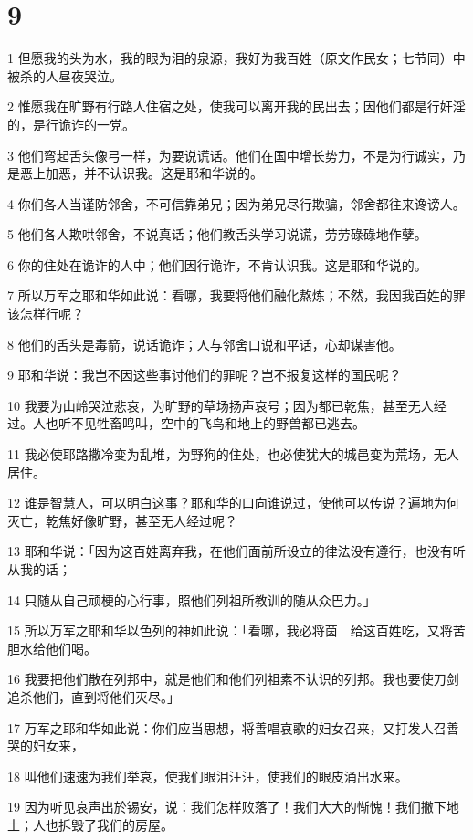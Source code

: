 \chapter{9}

\par 1 但愿我的头为水，我的眼为泪的泉源，我好为我百姓（原文作民女；七节同）中被杀的人昼夜哭泣。
\par 2 惟愿我在旷野有行路人住宿之处，使我可以离开我的民出去；因他们都是行奸淫的，是行诡诈的一党。
\par 3 他们弯起舌头像弓一样，为要说谎话。他们在国中增长势力，不是为行诚实，乃是恶上加恶，并不认识我。这是耶和华说的。
\par 4 你们各人当谨防邻舍，不可信靠弟兄；因为弟兄尽行欺骗，邻舍都往来谗谤人。
\par 5 他们各人欺哄邻舍，不说真话；他们教舌头学习说谎，劳劳碌碌地作孽。
\par 6 你的住处在诡诈的人中；他们因行诡诈，不肯认识我。这是耶和华说的。
\par 7 所以万军之耶和华如此说：看哪，我要将他们融化熬炼；不然，我因我百姓的罪该怎样行呢？
\par 8 他们的舌头是毒箭，说话诡诈；人与邻舍口说和平话，心却谋害他。
\par 9 耶和华说：我岂不因这些事讨他们的罪呢？岂不报复这样的国民呢？
\par 10 我要为山岭哭泣悲哀，为旷野的草场扬声哀号；因为都已乾焦，甚至无人经过。人也听不见牲畜鸣叫，空中的飞鸟和地上的野兽都已逃去。
\par 11 我必使耶路撒冷变为乱堆，为野狗的住处，也必使犹大的城邑变为荒场，无人居住。
\par 12 谁是智慧人，可以明白这事？耶和华的口向谁说过，使他可以传说？遍地为何灭亡，乾焦好像旷野，甚至无人经过呢？
\par 13 耶和华说：「因为这百姓离弃我，在他们面前所设立的律法没有遵行，也没有听从我的话；
\par 14 只随从自己顽梗的心行事，照他们列祖所教训的随从众巴力。」
\par 15 所以万军之耶和华以色列的神如此说：「看哪，我必将茵　给这百姓吃，又将苦胆水给他们喝。
\par 16 我要把他们散在列邦中，就是他们和他们列祖素不认识的列邦。我也要使刀剑追杀他们，直到将他们灭尽。」
\par 17 万军之耶和华如此说：你们应当思想，将善唱哀歌的妇女召来，又打发人召善哭的妇女来，
\par 18 叫他们速速为我们举哀，使我们眼泪汪汪，使我们的眼皮涌出水来。
\par 19 因为听见哀声出於锡安，说：我们怎样败落了！我们大大的惭愧！我们撇下地土；人也拆毁了我们的房屋。
